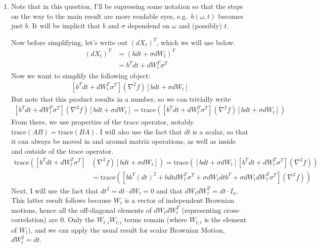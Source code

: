 \documentclass[12pt]{article}
\theoremstyle{plain}
\theoremstyle{definition}
\theoremstyle{remark}
\begin{document}
\begin{enumerate}
\begin{enumerate}
    \end{enumerate}

  \item %
    Note that in this question, I'll be supressing some notation so that
    the steps on the way to the main result are more readable eyes,
    e.g.\ $b(\omega,t)$ becomes just $b$. It will be implicit that $b$
    and $\sigma$ dependend on $\omega$ and (possibly) $t$.

    Now before simplifying, let's write out $(dX_t)^T$, which we will
    use below.
    \begin{align*}
      (dX_t)^T
        &= (bdt + \sigma dW_t)^T\\
        &= b^T dt+ dW_t^T \sigma^T
    \end{align*}
    Now we want to simplify the following object:
    \begin{align*}
      \left[b^T dt+ dW_t^T \sigma^T \right](\nabla^2 f)
      \left[b dt+ \sigma dW_t  \right]
    \end{align*}
    But note that this product results in a number, so we can trivially
    write
    \begin{align*}
      \left[b^T dt+ dW_t^T \sigma^T \right](\nabla^2 f)
      \left[b dt+ \sigma dW_t  \right]
      =
      \text{trace}\left( \left[b^T dt+ dW_t^T \sigma^T \right](\nabla^2 f)
      \left[b dt+ \sigma dW_t  \right]\right)
    \end{align*}
    From there, we use properties of the trace operator, notably
    $\text{trace}(AB)=\text{trace}(BA)$. I will also use the fact that
    $dt$ is a scalar, so that it can always be moved in and around
    matrix operations, as well as inside and outside of the trace
    operator.
    \begin{align*}
      \text{trace}\left( \left[b^T dt+ dW_t^T \sigma^T \right]
      \right.&\left.
      (\nabla^2 f)
      \left[b dt+ \sigma dW_t  \right]\right)
      =
      \text{trace}\left(
        \left[b dt+ \sigma dW_t  \right]
        \left[b^T dt+ dW_t^T \sigma^T \right]
        (\nabla^2 f) \right)\\
      &=
      \text{trace}\left(
        \left[bb^T (dt)^2 + b dtdW^T_t\sigma^T + \sigma  dW_t dt b^T
          + \sigma dW_t dW_t^T \sigma^T
        \right]
        (\nabla^2 f) \right)
    \end{align*}
    Next, I will use the fact that $dt^2 = dt \cdot dW_t = 0$ and that
    $dW_t dW_t^T =dt \cdot I_n$. This latter result follows because
    $W_t$ is a vector of independent Brownian motions, hence all the
    off-diagonal elements of $dW_t dW_t^T$ (representing
    cross-correlation) are 0. Only the $W_{t,i} W_{t,i}$ terms remain
    (where $W_{t,i}$ is the element of $W_t)$, and we can apply the
    usual result for scalar Brownian Motion, $dW_t^2 = dt$.


\end{enumerate}
\end{document}
